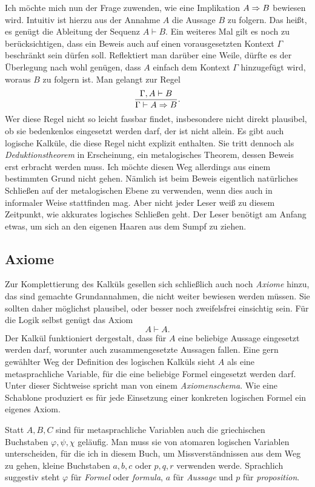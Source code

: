 Ich möchte mich nun der Frage zuwenden, wie eine Implikation $A\Rightarrow B$
bewiesen wird. Intuitiv ist hierzu aus der Annahme $A$ die
Aussage $B$ zu folgern. Das heißt, es genügt die Ableitung
der Sequenz $A\vdash B$. Ein weiteres Mal gilt es noch zu
berücksichtigen, dass ein Beweis auch auf einen vorausgesetzten
Kontext $\Gamma$ beschränkt sein dürfen soll. Reflektiert man darüber
eine Weile, dürfte es der Überlegung nach wohl genügen, dass $A$
einfach dem Kontext $\Gamma$ hinzugefügt wird, woraus $B$ zu folgern
ist. Man gelangt zur Regel
\[\dfrac{\Gamma,A\vdash B}{\Gamma\vdash A\Rightarrow B}.\]
Wer diese Regel nicht so leicht fassbar findet, insbesondere nicht
direkt plausibel, ob sie bedenkenlos eingesetzt werden darf, der
ist nicht allein. Es gibt auch logische Kalküle, die diese Regel nicht
explizit enthalten. Sie tritt dennoch als \emph{Deduktionstheorem} in
Erscheinung, ein metalogisches Theorem, dessen Beweis erst erbracht
werden muss. Ich möchte diesen Weg allerdings aus einem bestimmten Grund
nicht gehen. Nämlich ist beim Beweis eigentlich natürliches Schließen
auf der metalogischen Ebene zu verwenden, wenn dies auch in informaler
Weise stattfinden mag. Aber nicht jeder Leser weiß zu diesem Zeitpunkt,
wie akkurates logisches Schließen geht. Der Leser benötigt am Anfang
etwas, um sich an den eigenen Haaren aus dem Sumpf zu ziehen.

\subsection{Axiome}

Zur Komplettierung des Kalküls gesellen sich schließlich auch noch
\emph{Axiome} hinzu, das sind gemachte Grundannahmen, die
nicht weiter bewiesen werden müssen. Sie sollten daher möglichst
plausibel, oder besser noch zweifelsfrei einsichtig sein. Für die Logik
selbst genügt das Axiom
\[A\vdash A.\]
Der Kalkül funktioniert dergestalt, dass für $A$ eine beliebige Aussage
eingesetzt werden darf, worunter auch zusammengesetzte Aussagen
fallen. Eine gern gewählter Weg der Definition des logischen
Kalküls sieht $A$ als eine metasprachliche Variable, für die eine
beliebige Formel eingesetzt werden darf. Unter dieser Sichtweise
spricht man von einem \emph{Axiomenschema}. Wie
eine Schablone produziert es für jede Einsetzung einer konkreten
logischen Formel ein eigenes Axiom.

Statt $A,B,C$ sind für metasprachliche Variablen auch
die griechischen Buchstaben $\varphi,\psi,\chi$ geläufig. Man muss sie
von atomaren logischen Variablen unterscheiden, für die ich in diesem
Buch, um Missverständnissen aus dem Weg zu gehen, kleine Buchstaben
$a,b,c$ oder $p,q,r$ verwenden werde. Sprachlich suggestiv steht
$\varphi$ für \emph{Formel} oder \emph{formula}, $a$ für
\emph{Aussage} und $p$ für \emph{proposition}.

